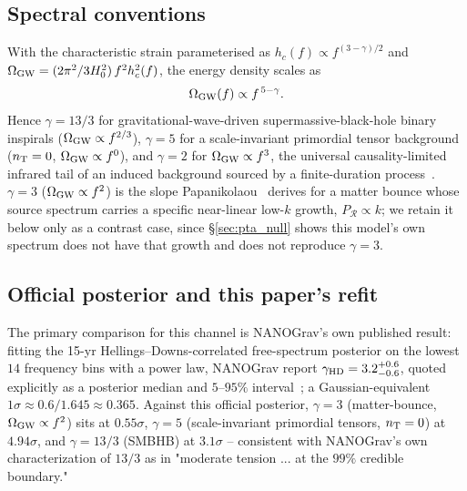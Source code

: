 \documentclass[aps,prd,twocolumn,superscriptaddress,nofootinbib,longbibliography]{revtex4-2}
\newcommand{\OmGW}{\Omega_{\rm GW}}
\begin{document}
\subsection{Spectral conventions}

With the characteristic strain parameterised as $h_c(f) \propto
f^{(3-\gamma)/2}$ and
$\OmGW = (2\pi^2/3H_0^2)\, f^2 h_c^2(f)$, the energy density scales as
\begin{equation}
  \OmGW(f) \propto f^{\,5-\gamma}.
  \label{eq:slope}
\end{equation}
Hence $\gamma = 13/3$ for gravitational-wave-driven supermassive-black-hole
binary inspirals ($\OmGW \propto f^{2/3}$), $\gamma = 5$ for a scale-invariant
primordial tensor background ($n_{\rm T} = 0$, $\OmGW \propto f^0$), and
$\gamma = 2$ for $\OmGW\propto f^3$, the universal causality-limited infrared
tail of an induced background sourced by a finite-duration
process~\cite{CaiPiSasaki2020}. $\gamma = 3$ ($\OmGW \propto f^2$) is the
slope Papanikolaou~\cite{Papanikolaou2025} derives for a matter bounce whose
source spectrum carries a specific near-linear low-$k$ growth,
$P_\mathcal{R}\propto k$; we retain it below only as a contrast case, since
\S\ref{sec:pta_null} shows this model's own spectrum does not have
that growth and does not reproduce $\gamma=3$.

\subsection{Official posterior and this paper's refit}

The primary comparison for this channel is NANOGrav's own published result:
fitting the 15-yr Hellings--Downs-correlated free-spectrum posterior on the
lowest $14$ frequency bins with a power law, NANOGrav report
$\gamma_{\rm HD} = 3.2^{+0.6}_{-0.6}$, quoted explicitly as a posterior median
and $5$--$95\%$ interval~\cite{NANOGrav15}; a Gaussian-equivalent
$1\sigma \approx 0.6/1.645 \approx 0.365$. Against this official posterior,
$\gamma=3$ (matter-bounce, $\OmGW\propto f^2$) sits at $0.55\sigma$, $\gamma=5$
(scale-invariant primordial tensors, $n_{\rm T}=0$) at $4.94\sigma$, and
$\gamma=13/3$ (SMBHB) at $3.1\sigma$ -- consistent with NANOGrav's own
characterization of $13/3$ as in "moderate tension ... at the $99\%$ credible
boundary."
\end{document}
